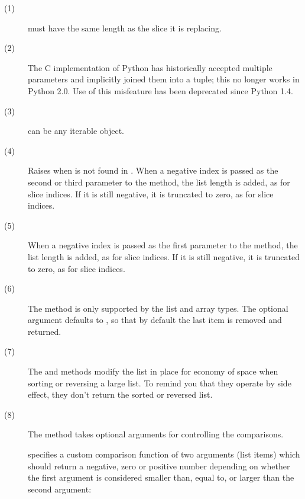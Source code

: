 \begin{description}
\item[(1)]  must have the same length as the slice it is 
  replacing.

\item[(2)] The C implementation of Python has historically accepted
  multiple parameters and implicitly joined them into a tuple; this
  no longer works in Python 2.0.  Use of this misfeature has been
  deprecated since Python 1.4.

\item[(3)]  can be any iterable object.

\item[(4)] Raises  when  is not found in
  . When a negative index is passed as the second or third parameter
  to the  method, the list length is added, as for slice
  indices.  If it is still negative, it is truncated to zero, as for
  slice indices.  

\item[(5)] When a negative index is passed as the first parameter to
  the  method, the list length is added, as for slice
  indices.  If it is still negative, it is truncated to zero, as for
  slice indices.  

\item[(6)] The  method is only supported by the list and
  array types.  The optional argument  defaults to ,
  so that by default the last item is removed and returned.

\item[(7)] The  and  methods modify the
  list in place for economy of space when sorting or reversing a large
  list.  To remind you that they operate by side effect, they don't return
  the sorted or reversed list.

\item[(8)] The  method takes optional arguments for
  controlling the comparisons.

   specifies a custom comparison function of two arguments
     (list items) which should return a negative, zero or positive number
     depending on whether the first argument is considered smaller than,
     equal to, or larger than the second argument:
     

\end{description}
